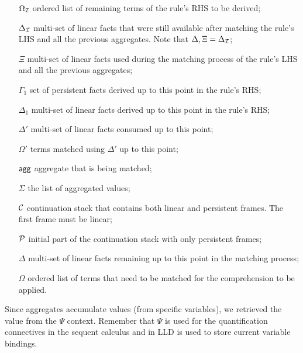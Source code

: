\begin{enumerate}

   \item[$\Omega_{\mathcal{I}}$] ordered list of remaining terms of the rule's RHS to be
      derived;

   \item[$\Delta_{\mathcal{I}}$] multi-set of linear facts that were still available after
      matching the rule's LHS and all the previous aggregates. Note that
      $\Delta, \Xi = \Delta_{\mathcal{I}}$;

   \item[$\Xi$] multi-set of linear facts used during the matching process of
      the rule's LHS and all the previous aggregates;

   \item[$\Gamma_{1}$] set of persistent facts derived up to this point in the
   rule's RHS;

   \item[$\Delta_{1}$] multi-set of linear facts derived up to this point in
   the rule's RHS;

   \item[$\Delta'$] multi-set of linear facts consumed up to this point;

   \item[$\Omega'$] terms matched using $\Delta'$ up to this point;

   \item[$\mathsf{agg}$] aggregate that is being matched;

   \item[$\Sigma$] the list of aggregated values;

   \item[$\mathcal{C}$] continuation stack that contains both linear and persistent
   frames. The first frame must be linear;

   \item[$\mathcal{P}$] initial part of the continuation stack with only persistent
   frames;

   \item[$\Delta$] multi-set of linear facts remaining up to this point in the
   matching process;

   \item[$\Omega$] ordered list of terms that need to be matched for the
   comprehension to be applied.

\end{enumerate}

Since aggregates accumulate values (from specific variables), we retrieved the
value from the $\Psi$ context. Remember that $\Psi$ is used for the
quantification connectives in the sequent calculus and in LLD is used to store
current variable bindings.


